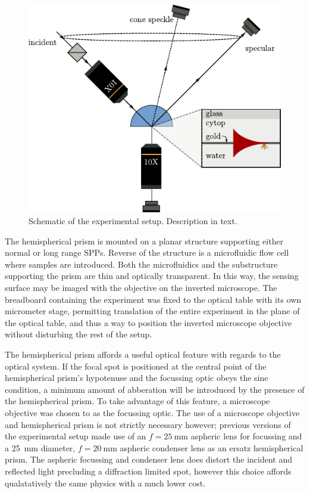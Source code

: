 \begin{figure}[ht]
\centering
 \includegraphics[keepaspectratio]{experimental/figures/conefig.pdf}
 \caption{Schematic of the experimental setup.  Description in text.}
 \label{fig:experimentalsetup}
\end{figure}

The hemispherical prism is mounted on a planar structure supporting either
normal or long range SPPs.  Reverse of the structure is a microfluidic flow
cell where samples are introduced.  Both the microfluidics and the
substructure supporting the prism are thin and optically transparent.  In
this way, the sensing surface may be imaged with the objective on the
inverted microscope.  The breadboard containing the experiment was fixed to
the optical table with its own micrometer stage, permitting translation of
the entire experiment in the plane of the optical table, and thus a way to
position the inverted microscope objective without disturbing the rest of
the setup.

The hemispherical prism affords a useful optical feature with regards to
the optical system.  If the focal spot is positioned at the central point
of the hemispherical prism's hypotenuse and the focussing optic obeys the
sine condition, a minimum amount of abberation will be introduced by the
presence of the hemispherical prism.  To take advantage of this feature, a
microscope objective was chosen to as the focussing optic.  The use of a
microscope objective and hemispherical prism is not strictly necessary
however; previous versions of the experimental setup made use of an
$f=\SI{25}{\milli\meter}$ aspheric lens for focussing and a
\SI{25}{\milli\meter} diameter, $f=\SI{20}{\milli\meter}$ aspheric
condenser lens as an ersatz hemispherical prism.  The aspheric focussing
and condenser lens does distort the incident and reflected light precluding
a diffraction limited spot, however this choice affords qualatatively the
same physics with a much lower cost.

